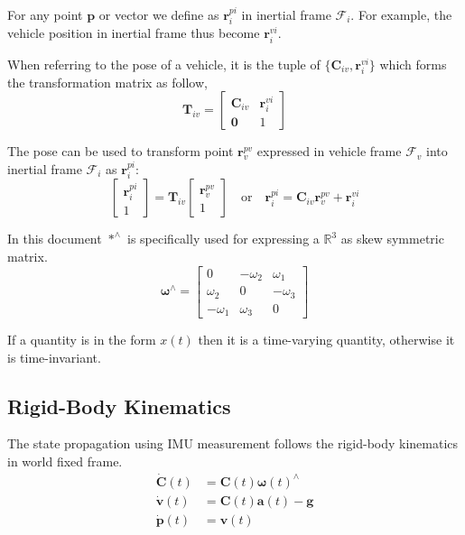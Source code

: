 \documentclass[conference]{IEEEtran}
\begin{document}
For any point $\textbf{p}$ or vector we define as $\textbf{r}_i^{pi}$ in inertial frame $\mathcal{F}_i$. For example, the vehicle position in inertial frame thus become $\textbf{r}_i^{vi}$.

When referring to the pose of a vehicle, it is the tuple of $\{\textbf{C}_{iv}, \textbf{r}_i^{vi}\}$ which forms the transformation matrix as follow,
$$
\textbf{T}_{iv} = \left[\begin{matrix}
    \textbf{C}_{iv} & \textbf{r}_i^{vi} \\
    \textbf{0} & 1
\end{matrix}\right]
$$

The pose can be used to transform point $\textbf{r}_v^{pv}$ expressed in vehicle frame $\bm{\mathcal{F}}_v$ into inertial frame $\bm{\mathcal{F}}_i$ as $\textbf{r}_i^{pi}$:
$$
\left[\begin{matrix} \textbf{r}_i^{pi} \\ 1 \end{matrix}\right]
    = \textbf{T}_{iv} \left[\begin{matrix} \textbf{r}_v^{pv} \\ 1 \end{matrix}\right]
\quad \text{or} \quad
\textbf{r}_i^{pi} = \textbf{C}_{iv} \textbf{r}_v^{pv} + \textbf{r}_i^{vi}
$$

In this document $*^\wedge$ is specifically used for expressing a $\mathbb{R}^3$ as skew symmetric matrix.
$$
\bm{\omega}^\wedge = \left[\begin{matrix}
    0 & -\omega_2 & \omega_1 \\
    \omega_2 & 0 & -\omega_3 \\
    -\omega_1 & \omega_3 & 0
\end{matrix}\right]
$$

If a quantity is in the form $x(t)$ then it is a time-varying quantity, otherwise it is time-invariant.

\subsection{Rigid-Body Kinematics}

The state propagation using IMU measurement follows the rigid-body kinematics in world fixed frame.
\begin{equation}
\begin{align}
    \dot{\textbf{C}}(t) &= \textbf{C}(t) \bm{\omega}(t)^\wedge \\
    \dot{\textbf{v}}(t) &= \textbf{C}(t) \textbf{a}(t) - \textbf{g} \\
    \dot{\textbf{p}}(t) &= \textbf{v}(t)
\end{align}
\end{equation}
\end{document}
